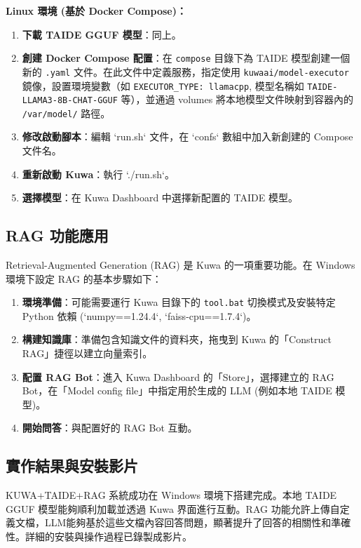 \documentclass[twocolumn,11pt,a4paper]{article}
\begin{document}
\textbf{Linux 環境 (基於 Docker Compose)：}
\begin{enumerate}[noitemsep, topsep=0pt]
    \item \textbf{下載 TAIDE GGUF 模型}：同上。
    \item \textbf{創建 Docker Compose 配置}：在 \texttt{compose} 目錄下為 TAIDE 模型創建一個新的 \texttt{.yaml} 文件。在此文件中定義服務，指定使用 \texttt{kuwaai/model-executor} 鏡像，設置環境變數（如 \texttt{EXECUTOR\_TYPE: llamacpp}, 模型名稱如 \texttt{TAIDE-LLAMA3-8B-CHAT-GGUF} 等），並通過 volumes 將本地模型文件映射到容器內的 \texttt{/var/model/} 路徑。
    \item \textbf{修改啟動腳本}：編輯 `run.sh` 文件，在 `confs` 數組中加入新創建的 Compose 文件名。
    \item \textbf{重新啟動 Kuwa}：執行 `./run.sh`。
    \item \textbf{選擇模型}：在 Kuwa Dashboard 中選擇新配置的 TAIDE 模型。
\end{enumerate}

\subsection{RAG 功能應用}
Retrieval-Augmented Generation (RAG) 是 Kuwa 的一項重要功能。在 Windows 環境下設定 RAG 的基本步驟如下：
\begin{enumerate}[noitemsep, topsep=0pt]
    \item \textbf{環境準備}：可能需要運行 Kuwa 目錄下的 \texttt{tool.bat} 切換模式及安裝特定 Python 依賴 (`numpy==1.24.4`, `faiss-cpu==1.7.4`)。
    \item \textbf{構建知識庫}：準備包含知識文件的資料夾，拖曳到 Kuwa 的「Construct RAG」捷徑以建立向量索引。
    \item \textbf{配置 RAG Bot}：進入 Kuwa Dashboard 的「Store」，選擇建立的 RAG Bot，在「Model config file」中指定用於生成的 LLM (例如本地 TAIDE 模型)。
    \item \textbf{開始問答}：與配置好的 RAG Bot 互動。
\end{enumerate}

\subsection{實作結果與安裝影片}
KUWA+TAIDE+RAG 系統成功在 Windows 環境下搭建完成。本地 TAIDE GGUF 模型能夠順利加載並透過 Kuwa 界面進行互動。RAG 功能允許上傳自定義文檔，LLM能夠基於這些文檔內容回答問題，顯著提升了回答的相關性和準確性。詳細的安裝與操作過程已錄製成影片。
\end{document}
